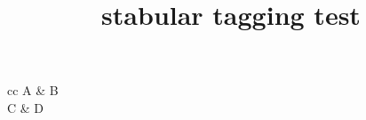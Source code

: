 \documentclass{article}
\title{stabular tagging test}
\begin{document}
\begin{stabular}{cc}
A & B \\
C & D
\end{stabular}
\end{document}
